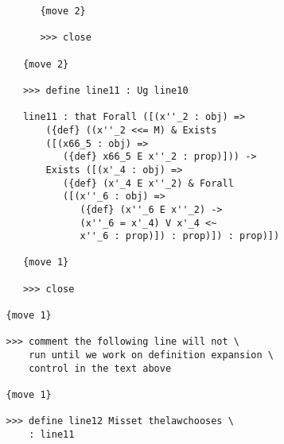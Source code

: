 \documentclass{article}
\begin{document}
\begin{verbatim}
         {move 2}

         >>> close

      {move 2}

      >>> define line11 : Ug line10

      line11 : that Forall ([(x''_2 : obj) => 
          ({def} ((x''_2 <<= M) & Exists 
          ([(x66_5 : obj) => 
             ({def} x66_5 E x''_2 : prop)])) -> 
          Exists ([(x'_4 : obj) => 
             ({def} (x'_4 E x''_2) & Forall 
             ([(x''_6 : obj) => 
                ({def} (x''_6 E x''_2) -> 
                (x''_6 = x'_4) V x'_4 <~ 
                x''_6 : prop)]) : prop)]) : prop)])

      {move 1}

      >>> close

   {move 1}

   >>> comment the following line will not \
       run until we work on definition expansion \
       control in the text above

   {move 1}

   >>> define line12 Misset thelawchooses \
       : line11


\end{verbatim}
\end{document}
